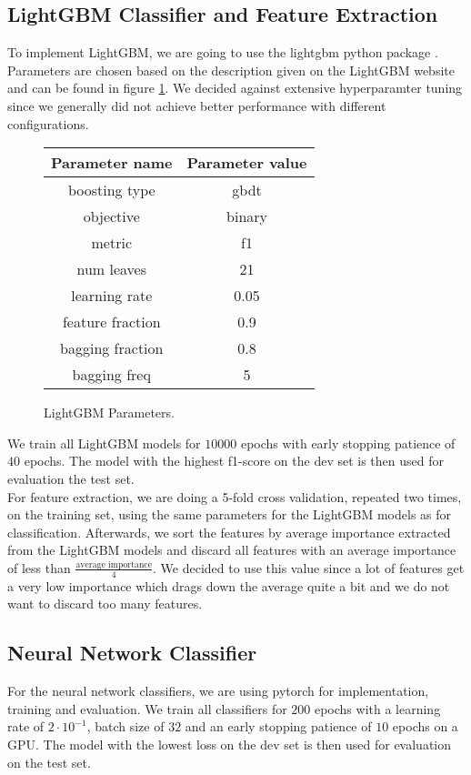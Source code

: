 \subsection{LightGBM Classifier and Feature Extraction}
To implement LightGBM, we are going to use the lightgbm python package \cite{lgbmpython}. Parameters are chosen based on the description given on the LightGBM website \cite{lgbmpython} and can be found in figure \ref{fig:lgbmparams}. We decided against extensive hyperparamter tuning since we generally did not achieve better performance with different configurations.

\begin{figure}[H]
  \begin{center}
   	\begin{tabular}{|| c | c ||}
   	\hline
   	Parameter name & Parameter value \\
   	\hline\hline
   	boosting type & gbdt \\
 	\hline
 	objective & binary \\
 	\hline
 	metric & f1 \\
 	\hline
 	num leaves & 21 \\
 	\hline
 	learning rate & 0.05 \\
 	\hline
 	feature fraction & 0.9 \\
 	\hline
 	bagging fraction & 0.8 \\
 	\hline
 	bagging freq & 5 \\
 	\hline
	\end{tabular}
  \end{center}
  \caption{LightGBM Parameters.}%
  \label{fig:lgbmparams}
\end{figure}

We train all LightGBM models for $10000$ epochs with early stopping patience of $40$ epochs. The model with the highest f1-score on the dev set is then used for evaluation the test set. \\
For feature extraction, we are doing a 5-fold cross validation, repeated two times, on the training set, using the same parameters for the LightGBM models as for classification. Afterwards, we sort the features by average importance extracted from the LightGBM models and discard all features with an average importance of less than $\frac{\text{average importance}}{4}$. We decided to use this value since a lot of features get a very low importance which drags down the average quite a bit and we do not want to discard too many features.


\subsection{Neural Network Classifier}
For the neural network classifiers, we are using pytorch \cite{pytorch} for implementation, training and evaluation. We train all classifiers for $200$ epochs with a learning rate of $2 \cdot 10^{-1}$, batch size of $32$ and an early stopping patience of $10$ epochs on a GPU. The model with the lowest loss on the dev set is then used for evaluation on the test set.